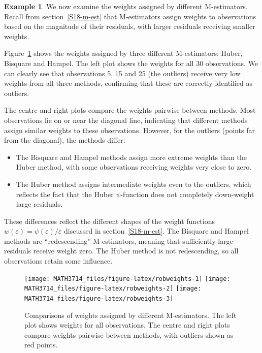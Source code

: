 \documentclass[
  a4paper,
]{article}
\providecommand{\tightlist}{%
  \setlength{\itemsep}{0pt}\setlength{\parskip}{0pt}}
\theoremstyle{definition}
\theoremstyle{definition}
\newtheorem{example}{Example}[section]
\theoremstyle{definition}
\theoremstyle{definition}
\theoremstyle{remark}
\begin{document}
\begin{example}

We now examine the weights assigned by different M-estimators.
Recall from section~\ref{S18-m-est} that M-estimators assign weights
to observations based on the magnitude of their residuals, with larger
residuals receiving smaller weights.

Figure~\ref{fig:robweights} shows the weights assigned by three
different M-estimators: Huber, Bisquare and Hampel. The left plot
shows the weights for all 30 observations. We can clearly see that
observations 5, 15 and 25 (the outliers) receive very low weights
from all three methods, confirming that these are correctly identified
as outliers.

The centre and right plots compare the weights pairwise between methods.
Most observations lie on or near the diagonal line, indicating that
different methods assign similar weights to these observations.
However, for the outliers (points far from the diagonal), the methods
differ:

\begin{itemize}
\tightlist
\item
  The Bisquare and Hampel methods assign more extreme weights than
  the Huber method, with some observations receiving weights very close
  to zero.
\item
  The Huber method assigns intermediate weights even to the outliers,
  which reflects the fact that the Huber \(\psi\)-function does not
  completely down-weight large residuals.
\end{itemize}

These differences reflect the different shapes of the weight functions
\(w(\varepsilon) = \psi(\varepsilon) / \varepsilon\) discussed in section~\ref{S18-m-est}.
The Bisquare and Hampel methods are ``redescending'' M-estimators, meaning
that sufficiently large residuals receive weight zero. The Huber method
is not redescending, so all observations retain some influence.

\begin{figure}
\texttt{[image: MATH3714\_files/figure-latex/robweights-1]} \texttt{[image: MATH3714\_files/figure-latex/robweights-2]} \texttt{[image: MATH3714\_files/figure-latex/robweights-3]} \caption{Comparisons of weights assigned by different M-estimators. The left plot shows weights for all observations. The centre and right plots compare weights pairwise between methods, with outliers shown as red points.}\label{fig:robweights}
\end{figure}

\end{example}
\end{document}
